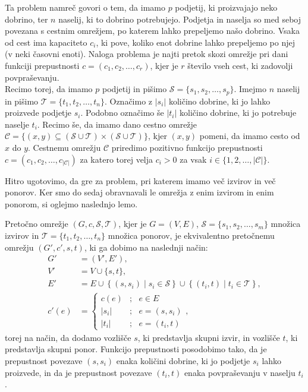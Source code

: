 \documentclass[mat1]{fmfdelo}
\begin{document}
Ta problem namreč govori o tem, da imamo $p$ podjetij, ki proizvajajo neko dobrino, ter $n$ naselij, ki to dobrino potrebujejo.
Podjetja in naselja so med seboj povezana s cestnim omrežjem, po katerem lahko prepeljemo našo dobrino. Vsaka od cest ima kapaciteto $c_i$,
ki pove, koliko enot dobrine lahko prepeljemo po njej (v neki časovni enoti). Naloga problema je najti pretok skozi omrežje pri dani funkciji
prepustnosti $c = (c_1, c_2, \dotsc, c_r)$, kjer je $r$ število vseh cest, ki zadovolji povpraševanju.\\

Recimo torej, da imamo $p$ podjetij in pišimo $\mathcal{S} = \{s_1, s_2, \dotsc, s_p\}$. Imejmo $n$ naselij in pišimo $\mathcal{T} = \{t_1, t_2, \dotsc, t_n\}$.
Označimo z $|s_i|$ količino dobrine, ki jo lahko proizvede podjetje $s_i$. Podobno označimo še $|t_i|$ količino dobrine, ki jo potrebuje naselje $t_i$.
Recimo še, da imamo dano cestno omrežje $\mathcal{C} = \{(x,y) \subseteq (\mathcal{S} \cup \mathcal{T}) \times (\mathcal{S} \cup \mathcal{T})\}$, kjer $(x,y)$ pomeni,
da imamo cesto od $x$ do $y$. Cestnemu omrežju $\mathcal{C}$ priredimo pozitivno funkcijo prepustnosti
$c = (c_1, c_2, \dotsc, c_{|\mathcal{C}|})$ za katero torej velja $c_i > 0$ za vsak $i \in \{1, 2, \dotsc, |\mathcal{C}|\}$.

Hitro ugotovimo, da gre za problem, pri katerem imamo več izvirov in več ponorov. Ker smo do sedaj obravnavali le omrežja z enim izvirom in enim
ponorom, si oglejmo naslednjo lemo.

\begin{lema}
  Pretočno omrežje $(G, c, \mathcal{S}, \mathcal{T})$, kjer je $G = (V,E)$, $\mathcal{S} = \{s_1, s_2, \dotsc, s_m\}$ množica izvirov in $\mathcal{T} = \{t_1, t_2, \dotsc, t_n\}$ množica ponorov,
  je ekvivalentno pretočnemu omrežju $(G', c', s, t)$, ki ga dobimo na naslednji način:
  \begin{align*}
    G' &= (V', E'),\\
    V' &= V \cup \{s, t\},\\
    E' &= E \cup \left\{(s, s_i) \mid s_i \in \mathcal{S}\right\} \cup \left\{(t_i, t) \mid t_i \in \mathcal{T}\right\},\\
    c'(e) &= \begin{cases} c(e) &;~~~ e \in E\\ |s_i| &;~~~ e = (s, s_i)\\ |t_i| &;~~~ e = (t_i, t) \end{cases},
  \end{align*}
  torej na način, da dodamo vozlišče $s$, ki predstavlja skupni izvir, in vozlišče $t$, ki predstavlja skupni ponor. Funkcijo prepustnosti posodobimo tako,
  da je prepustnost povezave $(s, s_i)$ enaka količini dobrine, ki jo podjetje $s_i$ lahko proizvede, in da je prepustnost povezave $(t_i, t)$ enaka povpraševanju v
  naselju $t_i$.
\end{lema}
\end{document}
